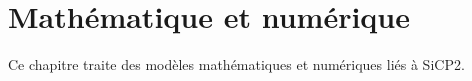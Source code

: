 \chapter{Mathématique et numérique}
%
Ce chapitre traite des modèles mathématiques et numériques liés à SiCP2.
%


%
